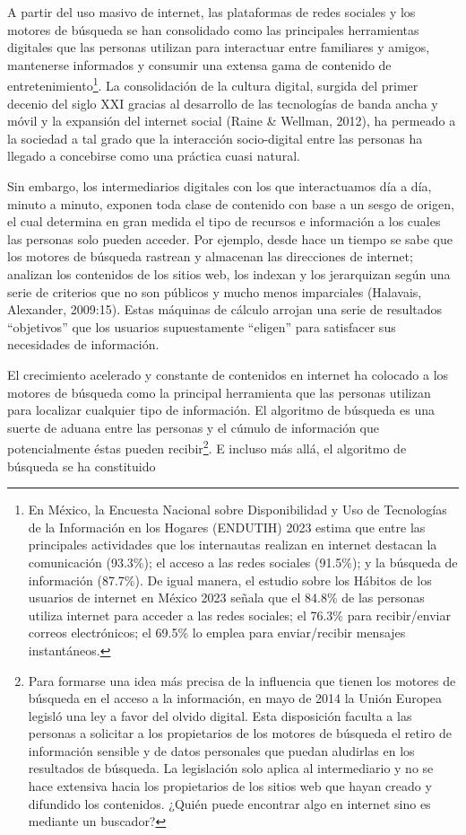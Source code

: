 \documentclass[
  13pt,
]{interact}
\begin{document}
A partir del uso masivo de internet, las plataformas de redes sociales y
los motores de búsqueda se han consolidado como las principales
herramientas digitales que las personas utilizan para interactuar entre
familiares y amigos, mantenerse informados y consumir una extensa gama
de contenido de entretenimiento\footnote{En México, la Encuesta Nacional
  sobre Disponibilidad y Uso de Tecnologías de la Información en los
  Hogares (ENDUTIH) 2023 estima que entre las principales actividades
  que los internautas realizan en internet destacan la comunicación
  (93.3\%); el acceso a las redes sociales (91.5\%); y la búsqueda de
  información (87.7\%). De igual manera, el estudio sobre los Hábitos de
  los usuarios de internet en México 2023 señala que el 84.8\% de las
  personas utiliza internet para acceder a las redes sociales; el 76.3\%
  para recibir/enviar correos electrónicos; el 69.5\% lo emplea para
  enviar/recibir mensajes instantáneos.}. La consolidación de la cultura
digital, surgida del primer decenio del siglo XXI gracias al desarrollo
de las tecnologías de banda ancha y móvil y la expansión del internet
social (Raine \& Wellman, 2012), ha permeado a la sociedad a tal grado
que la interacción socio-digital entre las personas ha llegado a
concebirse como una práctica cuasi natural.

Sin embargo, los intermediarios digitales con los que interactuamos día
a día, minuto a minuto, exponen toda clase de contenido con base a un
sesgo de origen, el cual determina en gran medida el tipo de recursos e
información a los cuales las personas solo pueden acceder. Por ejemplo,
desde hace un tiempo se sabe que los motores de búsqueda rastrean y
almacenan las direcciones de internet; analizan los contenidos de los
sitios web, los indexan y los jerarquizan según una serie de criterios
que no son públicos y mucho menos imparciales (Halavais, Alexander,
2009:15). Estas máquinas de cálculo arrojan una serie de resultados
``objetivos'' que los usuarios supuestamente ``eligen'' para satisfacer
sus necesidades de información.

El crecimiento acelerado y constante de contenidos en internet ha
colocado a los motores de búsqueda como la principal herramienta que las
personas utilizan para localizar cualquier tipo de información. El
algoritmo de búsqueda es una suerte de aduana entre las personas y el
cúmulo de información que potencialmente éstas pueden
recibir\footnote{Para formarse una idea más precisa de la influencia que
  tienen los motores de búsqueda en el acceso a la información, en mayo
  de 2014 la Unión Europea legisló una ley a favor del olvido digital.
  Esta disposición faculta a las personas a solicitar a los propietarios
  de los motores de búsqueda el retiro de información sensible y de
  datos personales que puedan aludirlas en los resultados de búsqueda.
  La legislación solo aplica al intermediario y no se hace extensiva
  hacia los propietarios de los sitios web que hayan creado y difundido
  los contenidos. ¿Quién puede encontrar algo en internet sino es
  mediante un buscador?}. E incluso más allá, el algoritmo de búsqueda
se ha constituido
\end{document}
